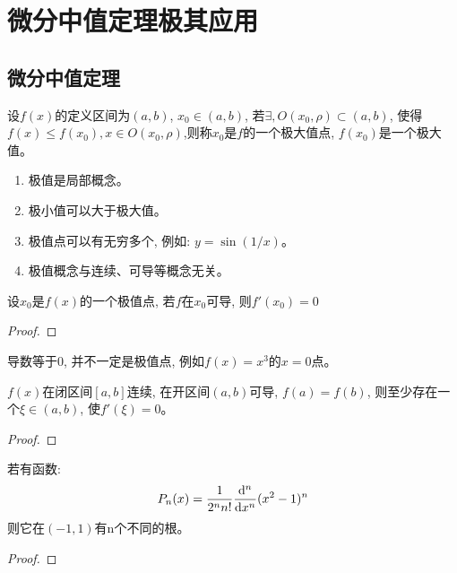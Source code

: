 \chapter{微分中值定理极其应用}
\section{微分中值定理}
\begin{definition}
    设$f(x)$的定义区间为$(a, b)$, $x_0 \in (a, b)$, 若$\exists, O(x_0, \rho) \subset (a, b)$, 使得$f(x) \le f(x_0), x \in O(x_0, \rho)$,则称$x_0$是$f$的一个极大值点, $f(x_0)$是一个极大值。
\end{definition}
\begin{remark}
    \begin{enumerate}
        \item 极值是局部概念。
        \item 极小值可以大于极大值。
        \item 极值点可以有无穷多个, 例如: $y = \sin(1/x)$。
        \item 极值概念与连续、可导等概念无关。
    \end{enumerate}
\end{remark}

\begin{lemma}[Fermat引理]\label{theorem:fermat}
    设$x_0$是$f(x)$的一个极值点, 若$f$在$x_0$可导, 则$f'(x_0) = 0$
\end{lemma}
\begin{proof}
    
\end{proof}
\begin{remark}
    导数等于0, 并不一定是极值点, 例如$f(x) = x^3$的$x = 0$点。
\end{remark}

\begin{theorem}[Rolle定理]\label{theorem:rolle}
    $f(x)$在闭区间$[a, b]$连续, 在开区间$(a, b)$可导, $f(a) = f(b)$, 则至少存在一个$\xi \in (a, b)$, 使$f'(\xi) = 0$。
\end{theorem}
\begin{proof}
    
\end{proof}

\begin{example}[(Legendre多项式)]
    若有函数:
    \begin{equation*}
        P_n(x) = \frac{1}{2^n n!}\frac{\mathrm{d}^n }{\mathrm{d} x^n}(x^2-1)^n
    \end{equation*}
    则它在$(-1, 1)$有n个不同的根。
\end{example}
\begin{proof}
    
\end{proof}

